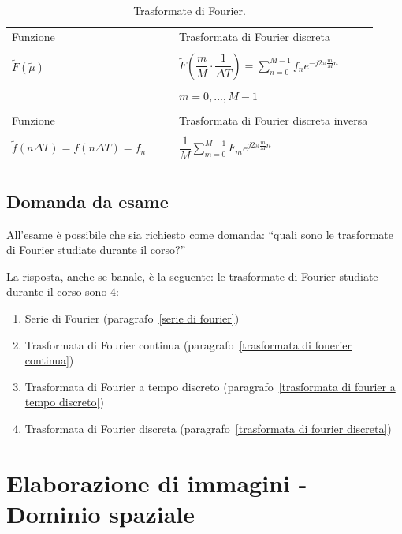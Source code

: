 \documentclass[a4paper]{article}
\newcommand{\dquotes}[1]{``#1''}
\begin{document}
\begin{table}[!htbp]
\begin{tabular}{@{} l l c l @{}}
			&&& \\
			\toprule
			Funzione & & & Trasformata di Fourier discreta \\
			\midrule
			&&& \\
			$\tilde{F}\left(\tilde{\mu}\right)$ &&& $\tilde{F}\left(\dfrac{m}{M} \cdot \dfrac{1}{\Delta T}\right) = \sum_{n = 0}^{M - 1} f_{n} e^{-j 2 \pi \frac{m}{M} n}$ \\
			&&& \\
			&&& $m = 0, ..., M - 1$ \\
			&&& \\
			\toprule
			Funzione & & & Trasformata di Fourier discreta inversa \\
			\midrule
			&&& \\
			$\tilde{f}\left(n \Delta T\right) = f\left(n \Delta T\right) = f_{n}$ &&& $\dfrac{1}{M} \sum_{m = 0}^{M - 1} F_{m} e^{j 2 \pi \frac{m}{M} n}$ \\
			&&& \\
			\bottomrule
		\end{tabular}
		\caption{Trasformate di Fourier.}
	\end{table}
	
	\newpage
	
	\subsection{Domanda da esame}
	
	All'esame è possibile che sia richiesto come domanda: \dquotes{quali sono le trasformate di Fourier studiate durante il corso?}
	
	La risposta, anche se banale, è la seguente: le trasformate di Fourier studiate durante il corso sono $4$:
	
	\begin{enumerate}[label=\Roman*.]
		\item Serie di Fourier (paragrafo~\ref{serie di fourier})
		\item Trasformata di Fourier continua (paragrafo~\ref{trasformata di fouerier continua})
		\item Trasformata di Fourier a tempo discreto (paragrafo~\ref{trasformata di fourier a tempo discreto})
		\item Trasformata di Fourier discreta (paragrafo~\ref{trasformata di fourier discreta})
	\end{enumerate}

	\newpage
	
	\section{Elaborazione di immagini - Dominio spaziale}
	
\end{document}
